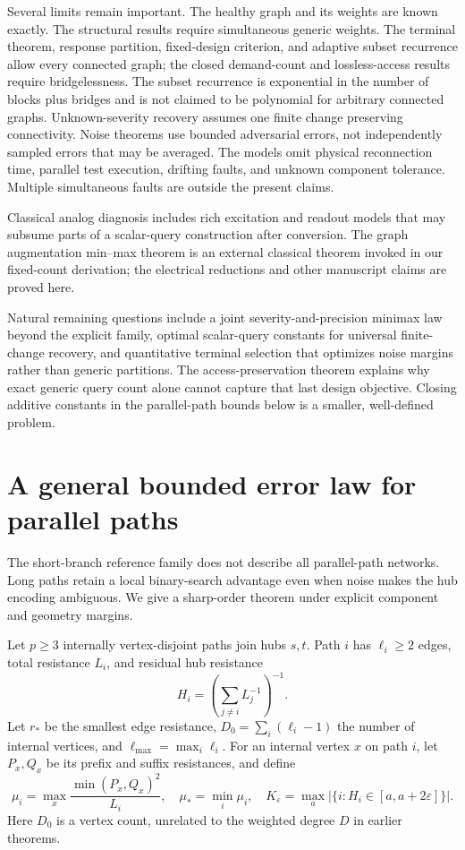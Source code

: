\documentclass[11pt,letterpaper]{article}
\begin{document}
Several limits remain important. The healthy graph and its weights are known exactly. The structural results require simultaneous generic weights. The terminal theorem, response partition, fixed-design criterion, and adaptive subset recurrence allow every connected graph; the closed demand-count and lossless-access results require bridgelessness. The subset recurrence is exponential in the number of blocks plus bridges and is not claimed to be polynomial for arbitrary connected graphs. Unknown-severity recovery assumes one finite change preserving connectivity. Noise theorems use bounded adversarial errors, not independently sampled errors that may be averaged. The models omit physical reconnection time, parallel test execution, drifting faults, and unknown component tolerance. Multiple simultaneous faults are outside the present claims.

Classical analog diagnosis includes rich excitation and readout models that may subsume parts of a scalar-query construction after conversion. The graph augmentation min--max theorem is an external classical theorem invoked in our fixed-count derivation; the electrical reductions and other manuscript claims are proved here.

Natural remaining questions include a joint severity-and-precision minimax law beyond the explicit family, optimal scalar-query constants for universal finite-change recovery, and quantitative terminal selection that optimizes noise margins rather than generic partitions. The access-preservation theorem explains why exact generic query count alone cannot capture that last design objective. Closing additive constants in the parallel-path bounds below is a smaller, well-defined problem.

\appendix
\section{A general bounded error law for parallel paths}\label{sec:parallel}
The short-branch reference family does not describe all parallel-path networks. Long paths retain a local binary-search advantage even when noise makes the hub encoding ambiguous. We give a sharp-order theorem under explicit component and geometry margins.

Let $p\ge3$ internally vertex-disjoint paths join hubs $s,t$. Path $i$ has $\ell_i\ge2$ edges, total resistance $L_i$, and residual hub resistance
\[
 H_i=\left(\sum_{j\ne i}L_j^{-1}\right)^{-1}.
\]
Let $r_*$ be the smallest edge resistance, $D_0=\sum_i(\ell_i-1)$ the number of internal vertices, and $\ell_{\max}=\max_i\ell_i$. For an internal vertex $x$ on path $i$, let $P_x,Q_x$ be its prefix and suffix resistances, and define
\[
 \mu_i=\max_x\frac{\min(P_x,Q_x)^2}{L_i},\quad
 \mu_*=\min_i\mu_i,\quad
 K_\varepsilon=\max_a|\{i:H_i\in[a,a+2\varepsilon]\}|.
\]
Here $D_0$ is a vertex count, unrelated to the weighted degree $D$ in earlier theorems.
\end{document}

